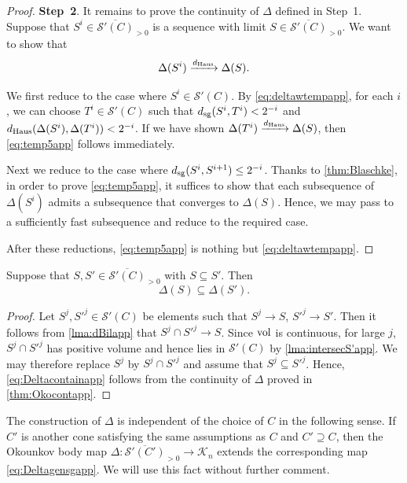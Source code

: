 \begin{proof}
    \textbf{Step~2}. It remains to prove the continuity of $\Delta$ defined in Step~1.
    Suppose that $S^i\in \overline{\mathcal{S}'(C)}_{>0}$ is a sequence with limit $S\in \overline{\mathcal{S}'(C)}_{>0}$.
    We want to show that
	\begin{equation}\label{eq:temp5app}
		\Delta(S^i)\xrightarrow{d_{\mathrm{Haus}}}\Delta(S).
	\end{equation}

    We first reduce to the case where $S^i\in \mathcal{S}'(C)$.
    By \eqref{eq:deltawtempapp}, for each $i$, we can choose $T^i\in \mathcal{S}'(C)$ such that $d_{\mathrm{sg}}(S^i,T^i)<2^{-i}$ and $d_{\mathrm{Haus}}(\Delta(S^i),\Delta(T^i))<2^{-i}$. If we have shown $\Delta(T^i)\xrightarrow{d_{\mathrm{Haus}}}\Delta(S)$, then \eqref{eq:temp5app} follows immediately.

    Next we reduce to the case where $d_{\mathrm{sg}}(S^i,S^{i+1})\leq 2^{-i}$. Thanks to \cref{thm:Blaschke}, in order to prove \eqref{eq:temp5app}, it suffices to show that each subsequence of $\Delta(S^i)$ admits a subsequence that converges to $\Delta(S)$. Hence, we may pass to a sufficiently fast subsequence and reduce to the required case.

    After these reductions, \eqref{eq:temp5app} is nothing but \eqref{eq:deltawtempapp}.
\end{proof}


\begin{corollary}\label{cor:Okocompapp}
    Suppose that $S,S'\in \overline{\mathcal{S}'(C)}_{>0}$ with $S\subseteq S'$. Then
    \begin{equation}\label{eq:Deltacontainapp}
    \Delta(S)\subseteq \Delta(S').
    \end{equation}
\end{corollary}
\begin{proof}
    Let $S^j,S'^j\in \mathcal{S}'(C)$ be elements such that $S^j\to S$, $S'^j\to S'$. Then it follows from \cref{lma:dBilapp} that $S^j\cap S'^j \to S$. Since $\operatorname{vol}$ is continuous, for large $j$, $S^j\cap S'^j$ has positive volume and hence lies in $\mathcal{S}'(C)$ by \cref{lma:intersecS'app}. We may therefore replace $S^j$ by $S^j\cap S'^j$ and assume that $S^j\subseteq S'^j$. Hence, \eqref{eq:Deltacontainapp} follows from the continuity of $\Delta$ proved in \cref{thm:Okocontapp}.
\end{proof}

\begin{remark}\label{rmk:almostsg:L542}
    The construction of $\Delta$ is independent of the choice of $C$ in the following sense. If $C'$ is another cone satisfying the same assumptions as $C$ and $C'\supseteq C$, then the Okounkov body map $\Delta \colon \overline{\mathcal{S}'(C')}_{>0}\rightarrow \mathcal{K}_n$ extends the corresponding map \eqref{eq:Deltagensgapp}. We will use this fact without further comment.
\end{remark}
